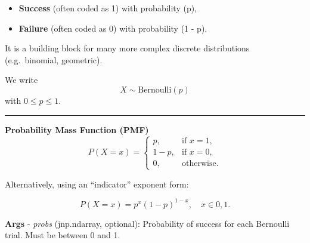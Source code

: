 \documentclass[
  letterpaper,
  DIV=11,
  numbers=noendperiod]{scrartcl}
\providecommand{\tightlist}{%
  \setlength{\itemsep}{0pt}\setlength{\parskip}{0pt}}\usepackage{longtable,booktabs,array}
\begin{document}
\begin{itemize}
\tightlist
\item
  \textbf{Success} (often coded as 1) with probability (p),
\item
  \textbf{Failure} (often coded as 0) with probability (1 - p).
\end{itemize}

It is a building block for many more complex discrete distributions
(e.g.~binomial, geometric).

We write \[
X \sim \mathrm{Bernoulli}(p)
\] with \(0 \le p \le 1\).

\begin{center}\rule{0.5\linewidth}{0.5pt}\end{center}

\textbf{Probability Mass Function (PMF)} \[
P(X = x) =
\begin{cases}
p, & \text{if } x = 1, \\
1 - p, & \text{if } x = 0, \\
0, & \text{otherwise.}
\end{cases}
\]

Alternatively, using an ``indicator'' exponent form:

\[
P(X = x) = p^x (1 - p)^{1 - x}, \quad x \in {0,1}.
\]

\textbf{Args} - \emph{probs} (jnp.ndarray, optional): Probability of
success for each Bernoulli trial. Must be between 0 and 1.
\end{document}
